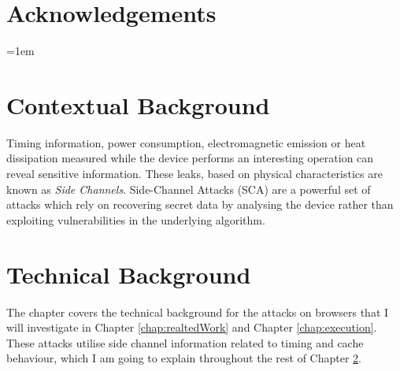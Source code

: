 \documentclass[10pt,a4paper,twoside]{book}
\begin{document}

\chapter*{Acknowledgements}

\noindent


\cleardoublepage
\pagestyle{marked}
\parindent=0in
\parskip=1em 



\chapter{Contextual Background}
\label{chap:context}

Timing information, power consumption, electromagnetic emission or heat dissipation measured while the device performs an interesting operation can reveal sensitive information. These leaks, based on physical characteristics are known as \textit{Side Channels}. Side-Channel Attacks (SCA) are a powerful set of attacks which rely on recovering secret data by analysing the device rather than exploiting vulnerabilities in the underlying algorithm. 


\chapter{Technical Background}
\label{chap:technical}


The chapter covers the technical background for the attacks on browsers that I will investigate in Chapter \ref{chap:realtedWork} and Chapter \ref{chap:execution}. These attacks utilise side channel information related to timing and cache behaviour, which I am going to explain throughout the rest of Chapter \ref{chap:technical}. 
\end{document}
